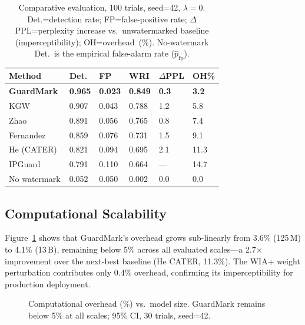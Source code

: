 \documentclass[conference]{IEEEtran}
\begin{document}
\begin{table}[H]
\caption{Comparative evaluation, 100 trials, seed=42, $\lambda{=}0$.
  Det.=detection rate; FP=false-positive rate; $\Delta$PPL=perplexity
  increase vs.\ unwatermarked baseline (imperceptibility); OH=overhead~(\%).
  No-watermark Det.\ is the empirical false-alarm rate ($\hat{p}_\text{fp}$).}
\label{tab:summary}
\renewcommand{\arraystretch}{1.1}
\begin{tabularx}{\columnwidth}{l X X X X X}
\toprule
\textbf{Method} & \textbf{Det.} & \textbf{FP} & \textbf{WRI}
  & \boldmath$\Delta$\textbf{PPL} & \textbf{OH\%} \\
\midrule
\textbf{GuardMark}                    & \textbf{0.965} & \textbf{0.023} & \textbf{0.849} & \textbf{0.3} & \textbf{3.2} \\
KGW~\cite{kirchenbauer2023watermark}   & 0.907 & 0.043 & 0.788 & 1.2  & 5.8  \\
Zhao~\cite{zhao2023protecting}         & 0.891 & 0.056 & 0.765 & 0.8  & 7.4  \\
Fernandez~\cite{fernandez2023three}    & 0.859 & 0.076 & 0.731 & 1.5  & 9.1  \\
He (CATER)~\cite{he2022cater}         & 0.821 & 0.094 & 0.695 & 2.1  & 11.3 \\
IPGuard~\cite{cao2021ipguard}         & 0.791 & 0.110 & 0.664 & ---  & 14.7 \\
No watermark                          & 0.052 & 0.050 & 0.002 & 0.0  & 0.0  \\
\bottomrule
\end{tabularx}
\end{table}

\subsection{Computational Scalability}

Figure~\ref{fig:scalability} shows that GuardMark's overhead grows
sub-linearly from 3.6\% (125\,M) to 4.1\% (13\,B), remaining below 5\%
across all evaluated scales---a 2.7$\times$ improvement over the next-best
baseline (He CATER, 11.3\%). The WIA+ weight perturbation contributes only
0.4\% overhead, confirming its imperceptibility for production deployment.

\begin{figure}[H]
\caption{Computational overhead (\%) vs.\ model size. GuardMark remains below
  5\% at all scales; 95\% CI, 30 trials, seed=42.}
\label{fig:scalability}
\centering

\end{figure}
\end{document}
